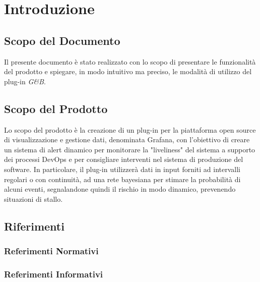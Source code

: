 \section{Introduzione}\label{Intro}

\subsection{Scopo del Documento}
Il presente documento è stato realizzato con lo scopo di presentare le funzionalità del prodotto e spiegare, in modo intuitivo ma preciso, le modalità di utilizzo del plug-in \textit{G\&B}.

\subsection{Scopo del Prodotto}
Lo scopo del prodotto è la creazione di un plug-in per la piattaforma open source di visualizzazione e gestione dati, denominata Grafana, con l'obiettivo di creare un sistema di alert dinamico per monitorare la "liveliness" del sistema a supporto dei processi DevOps e per consigliare interventi nel sistema di produzione del software. In particolare, il plug-in utilizzerà dati in input forniti ad intervalli regolari o con continuità, ad una rete bayesiana per stimare la probabilità di alcuni eventi, segnalandone quindi il rischio in modo dinamico, prevenendo situazioni di stallo.

\subsection{Riferimenti}\label{Riferimenti}
\subsubsection{Referimenti Normativi}


\subsubsection{Referimenti Informativi}

